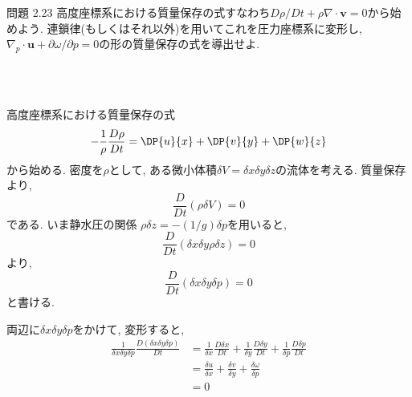 \documentclass[a4j,12pt,openbib,oneside,dvipdfmx]{jarticle}
\def\theequation{\arabic{chapter}.\arabic{equation}}
\def\thepage{\arabic{page}}
\begin{document}
\def\theequation{\arabic{equation}}
\setcounter{equation}{0}
\renewcommand{\thepage}{223-\arabic{page}}
\setcounter{page}{1}

\begin{itembox}[l]{問題 2.23}
高度座標系における質量保存の式すなわち$D\rho/Dt+\rho\nabla\cdot\bm{v}=0$から始めよう. 連鎖律(もしくはそれ以外)を用いてこれを圧力座標系に変形し, $\nabla_p\cdot\bm{u}+\partial{\omega}/\partial{p}=0$の形の質量保存の式を導出せよ.
\end{itembox}
\\
\\
\par
高度座標系における質量保存の式
\begin{equation}
  -\frac{1}{\rho}\frac{D\rho}{Dt}=\DP{u}{x}+\DP{v}{y}+\DP{w}{z} \label{mas}
\end{equation}
から始める.
密度を$\rho$として, ある微小体積$\delta{V}=\delta{x}\delta{y}\delta{z}$の流体を考える. 質量保存より,
\begin{equation}
  \frac{D}{Dt}(\rho\delta{V})=0 \label{mass}
\end{equation}
である. いま静水圧の関係 $\rho\delta{z}=-(1/g)\delta{p}$を用いると,
\begin{equation}
  \frac{D}{Dt}(\delta{x}\delta{y}\rho\delta{z})=0
\end{equation}
より,
\begin{equation}
  \frac{D}{Dt}(\delta{x}\delta{y}\delta{p})=0 \label{r}
\end{equation}
と書ける. \\
\par
両辺に$\delta{x}\delta{y}\delta{p}$をかけて, 変形すると,
\begin{subequations}
\begin{align}
  \frac{1}{\delta{x}\delta{y}\delta{p}}\frac{D{(\delta{x}\delta{y}\delta{p})}}{Dt}&=\frac{1}{\delta{x}}\frac{D\delta{x}}{Dt}+\frac{1}{\delta{y}}\frac{D\delta{y}}{Dt}+\frac{1}{\delta{p}}\frac{D\delta{p}}{Dt}\\ \nonumber
  &=\frac{\delta{u}}{\delta{x}}+\frac{\delta{v}}{\delta{y}}+\frac{\delta\omega}{\delta{p}}\\ \nonumber
  &=0 \nonumber
\end{align}
\end{subequations}
\end{document}
